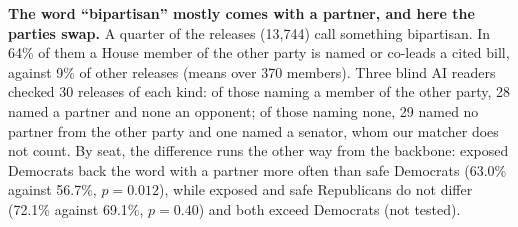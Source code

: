 \textbf{The word ``bipartisan'' mostly comes with a partner, and here the parties swap.} A quarter of the releases (13,744) call something bipartisan. In 64\% of them a House member of the other party is named or co-leads a cited bill, against 9\% of other releases (means over 370 members). Three blind AI readers checked 30 releases of each kind: of those naming a member of the other party, 28 named a partner and none an opponent; of those naming none, 29 named no partner from the other party and one named a senator, whom our matcher does not count. By seat, the difference runs the other way from the backbone: exposed Democrats back the word with a partner more often than safe Democrats (63.0\% against 56.7\%, $p = 0.012$), while exposed and safe Republicans do not differ (72.1\% against 69.1\%, $p = 0.40$) and both exceed Democrats (not tested).
